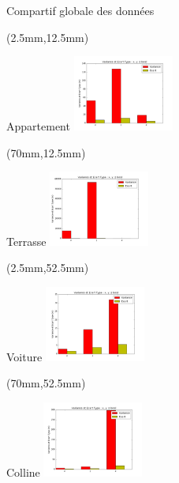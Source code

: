 \documentclass[10pt]{beamer}
\begin{document}
  \begin{frame}{Compartif globale des données}

    		\begin{textblock*}{60mm}(2.5mm,12.5mm)
	  		\begin{block}{Appartement}
				\includegraphics[width=125px]{../src/data/itinary_1/var_ecart1.png}
			\end{block}
  		\end{textblock*}

  		 \begin{textblock*}{60mm}(70mm,12.5mm)
  		 	\begin{block}{Terrasse}
				\includegraphics[width=125px]{../src/data/itinary_2/var_ecart2.png}
			\end{block}
  		\end{textblock*}

  		\begin{textblock*}{60mm}(2.5mm,52.5mm)
  		 	\begin{block}{Voiture}
				\includegraphics[width=125px]{../src/data/itinary_3/var_ecart3.png}
			\end{block}
  		\end{textblock*}


		\begin{textblock*}{60mm}(70mm,52.5mm)
			\begin{block}{Colline}
				\includegraphics[width=125px]{../src/data/itinary_4/var_ecart4.png}
			\end{block}
		\end{textblock*}
  \end{frame}
\end{document}
